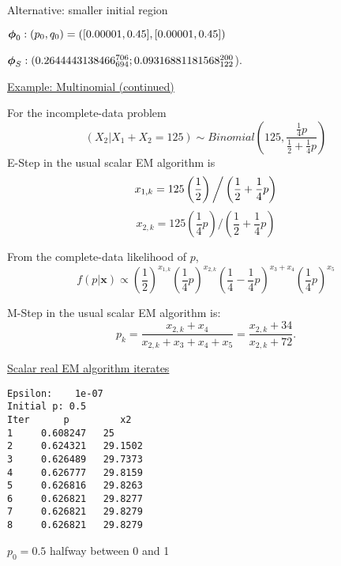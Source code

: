 \documentclass{slides}
\begin{document}
\begin{slide}
Alternative: smaller initial region

$\mbox{\boldmath $\phi$}_0: (p_0,q_0) =([0.00001,0.45],[0.00001,0.45])$ 

$\mbox{\boldmath $\phi$}_S:\\ (0.2644443138466_{694}^{706} ; 0.09316881181568_{122}^{200}$).
\es



\begin{slide}
\begin{center}
\underline{Example: Multinomial (continued)}
\end{center}
For the incomplete-data problem
$$(X_2 | X_1 + X_2 = 125) \sim
   Binomial \left(125, \frac{\frac{1}{4}p}{\frac{1}{2}+\frac{1}{4}p}\right)$$ 
E-Step in the usual scalar EM algorithm is
$$x_{1,k} = 125\left( \frac{1}{2}\right) \bigg{/} 
  \left(\frac{1}{2}+\frac{1}{4}p\right)$$ 
$$x_{2,k} = 125\left( \frac{1}{4}p\right) /
  \left(\frac{1}{2}+\frac{1}{4}p\right)$$

From the complete-data likelihood of $p$,
$$ f(p|\mathbf{x}) \propto 
   \left(\frac{1}{2}\right)^{x_{1,k}} \left(\frac{1}{4}p\right)^{x_{2,k}} 
   \left(\frac{1}{4}- \frac{1}{4} p\right)^{x_3 + x_4} 
   \left(\frac{1}{4} p\right)^{x_5} $$

M-Step in the usual scalar EM algorithm is:
$$
p_k = \frac{x_{2,k} + x_4}{x_{2,k} + x_3 + x_4 + x_5}
         =  \frac{x_{2,k} + 34}{x_{2,k} + 72} .
$$
\end{slide} 
\begin{slide}
\begin{center}
\underline{Scalar real EM algorithm iterates}
\end{center}
\begin{verbatim}
Epsilon:    1e-07
Initial p: 0.5
Iter      p         x2       
1     0.608247   25
2     0.624321   29.1502
3     0.626489   29.7373
4     0.626777   29.8159
5     0.626816   29.8263
6     0.626821   29.8277
7     0.626821   29.8279
8     0.626821   29.8279
\end{verbatim}
$p_0= 0.5$ halfway between 0 and 1


\end{slide}
\end{slide}
\end{document}
